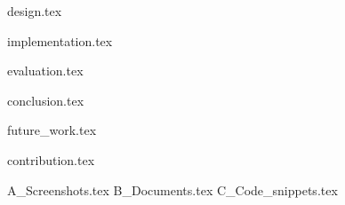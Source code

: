 \documentclass[11pt,a4paper]{report}
\numberwithin{figure}{section}
\numberwithin{table}{section}
\begin{document}
{design.tex}


{implementation.tex}


{evaluation.tex}


{conclusion.tex}


{future_work.tex}


{contribution.tex}
\clearpage

\appendix
{A_Screenshots.tex}
{B_Documents.tex}
{C_Code_snippets.tex}
\clearpage



\thispagestyle{empty}
\clearpage
\end{document}
